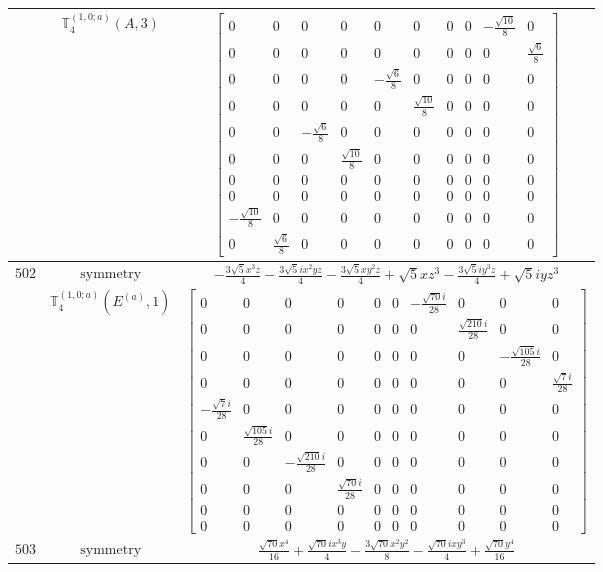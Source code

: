\documentclass[fleqn,8pt,landscape]{jsarticle}
\begin{document}
\begin{longtable}{ccc}
$  $ & $ \mathbb{T}_{4}^{(1,0;a)}(A,3) $ & $ \begin{bmatrix} 0 & 0 & 0 & 0 & 0 & 0 & 0 & 0 & - \frac{\sqrt{10}}{8} & 0 \\ 0 & 0 & 0 & 0 & 0 & 0 & 0 & 0 & 0 & \frac{\sqrt{6}}{8} \\ 0 & 0 & 0 & 0 & - \frac{\sqrt{6}}{8} & 0 & 0 & 0 & 0 & 0 \\ 0 & 0 & 0 & 0 & 0 & \frac{\sqrt{10}}{8} & 0 & 0 & 0 & 0 \\ 0 & 0 & - \frac{\sqrt{6}}{8} & 0 & 0 & 0 & 0 & 0 & 0 & 0 \\ 0 & 0 & 0 & \frac{\sqrt{10}}{8} & 0 & 0 & 0 & 0 & 0 & 0 \\ 0 & 0 & 0 & 0 & 0 & 0 & 0 & 0 & 0 & 0 \\ 0 & 0 & 0 & 0 & 0 & 0 & 0 & 0 & 0 & 0 \\ - \frac{\sqrt{10}}{8} & 0 & 0 & 0 & 0 & 0 & 0 & 0 & 0 & 0 \\ 0 & \frac{\sqrt{6}}{8} & 0 & 0 & 0 & 0 & 0 & 0 & 0 & 0 \end{bmatrix} $ \\ \hline
$ 502 $ & $ \text{symmetry} $ & $ - \frac{3 \sqrt{5} x^{3} z}{4} - \frac{3 \sqrt{5} i x^{2} y z}{4} - \frac{3 \sqrt{5} x y^{2} z}{4} + \sqrt{5} x z^{3} - \frac{3 \sqrt{5} i y^{3} z}{4} + \sqrt{5} i y z^{3} $ \\
$  $ & $ \mathbb{T}_{4}^{(1,0;a)}(E^{(a)},1) $ & $ \begin{bmatrix} 0 & 0 & 0 & 0 & 0 & 0 & - \frac{\sqrt{70} i}{28} & 0 & 0 & 0 \\ 0 & 0 & 0 & 0 & 0 & 0 & 0 & \frac{\sqrt{210} i}{28} & 0 & 0 \\ 0 & 0 & 0 & 0 & 0 & 0 & 0 & 0 & - \frac{\sqrt{105} i}{28} & 0 \\ 0 & 0 & 0 & 0 & 0 & 0 & 0 & 0 & 0 & \frac{\sqrt{7} i}{28} \\ - \frac{\sqrt{7} i}{28} & 0 & 0 & 0 & 0 & 0 & 0 & 0 & 0 & 0 \\ 0 & \frac{\sqrt{105} i}{28} & 0 & 0 & 0 & 0 & 0 & 0 & 0 & 0 \\ 0 & 0 & - \frac{\sqrt{210} i}{28} & 0 & 0 & 0 & 0 & 0 & 0 & 0 \\ 0 & 0 & 0 & \frac{\sqrt{70} i}{28} & 0 & 0 & 0 & 0 & 0 & 0 \\ 0 & 0 & 0 & 0 & 0 & 0 & 0 & 0 & 0 & 0 \\ 0 & 0 & 0 & 0 & 0 & 0 & 0 & 0 & 0 & 0 \end{bmatrix} $ \\ \hline
$ 503 $ & $ \text{symmetry} $ & $ \frac{\sqrt{70} x^{4}}{16} + \frac{\sqrt{70} i x^{3} y}{4} - \frac{3 \sqrt{70} x^{2} y^{2}}{8} - \frac{\sqrt{70} i x y^{3}}{4} + \frac{\sqrt{70} y^{4}}{16} $ \\

\end{longtable}
\end{document}
